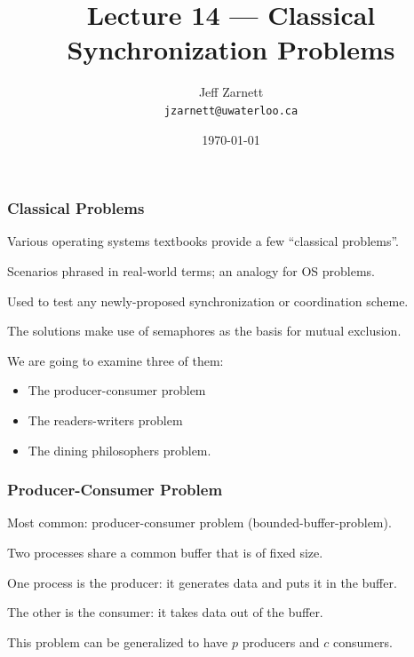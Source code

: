 

\title{Lecture 14 --- Classical Synchronization Problems }

\author{Jeff Zarnett \\ \small \texttt{jzarnett@uwaterloo.ca}}
\date{\today}




\begin{frame}
  \titlepage

 \end{frame}

\begin{frame}
\frametitle{Classical Problems}

Various operating systems textbooks provide a few ``classical problems''. 

Scenarios phrased in real-world terms; an analogy for OS problems. 

Used to test any newly-proposed synchronization or coordination scheme.

 The solutions make use of semaphores as the basis for mutual exclusion. 
 
 We are going to examine three of them: 
 \begin{itemize}
 \item The producer-consumer problem 
 \item The readers-writers problem 
 \item The dining philosophers problem.
 \end{itemize}


\end{frame}


\begin{frame}
\frametitle{Producer-Consumer Problem}

Most common: producer-consumer problem (bounded-buffer-problem). 

Two processes share a common buffer that is of fixed size. 

One process is the producer: it generates data and puts it in the buffer.

The other is the consumer: it takes data out of the buffer. 

This problem can be generalized to have $p$ producers and $c$ consumers.

\end{frame}



